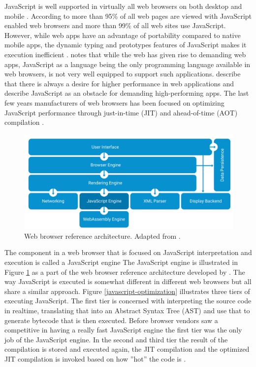 JavaScript is well supported in virtually all web browsers on both desktop and mobile \parencite{Zakai2011}. According to \textcite{TiwariSolihin2012} more than 95\% of all web pages are viewed with JavaScript enabled web browsers and more than 99\% of all web sites use JavaScript. However, while web apps have an advantage of portability compared to native mobile apps, the dynamic typing and prototypes features of JavaScript makes it execution inefficient \parencite{ParkJungMoon2015}. \textcite{HaasRossbergSchuffTitzerHolmanGohmanWagnerZakaiBastien2017} notes that while the web has given rise to demanding web apps, JavaScript as a language being the only programming language available in web browsers, is not very well equipped to support such applications. \textcite{ReiserBlaser2017} describe that there is always a desire for higher performance in web applications and \textcite{Zakai2018} describe JavaScript as an obstacle for demanding high-performing apps. The last few years manufacturers of web browsers has been focused on optimizing JavaScript performance through just-in-time (JIT) and ahead-of-time (AOT) compilation \parencite{HerreraChenLavoieHendren2018}.

\begin{figure}[!h]
\centering
\includegraphics[width=16cm,keepaspectratio]{figures/reference-architecture}
\caption{Web browser reference architecture. Adapted from \textcite{GrosskurthGodfrey2005}.}
\label{reference-architecture}
\end{figure}

The component in a web browser that is focused on JavaScript interpretation and execution is called a JavaScript engine \parencite{JeonChoi2012} The JavaScript engine is illustrated in Figure \ref{reference-architecture} as a part of the web browser reference architecture developed by \textcite{GrosskurthGodfrey2005}. The way JavaScript is executed is somewhat different in different web browsers but all share a similar approach. Figure \ref{javascript-optimization} illustrates three tiers of executing JavaScript. The first tier is concerned with interpreting the source code in realtime, translating that into an Abstract Syntax Tree (AST) and use that to generate bytecode that is then executed. Before browser vendors saw a competitive in having a really fast JavaScript engine the first tier was the only job of the JavaScript engine. In the second and third tier the result of the compilation is stored and executed again, the JIT compilation and the optimized JIT compilation is invoked based on how ''hot'' the code is \parencite{KedlayaRobatmiliHardekopf2015,ParkKimParkMoon2018}.

